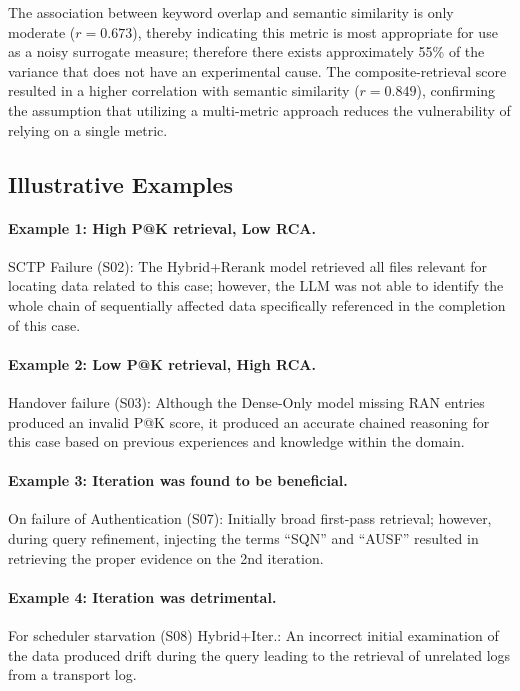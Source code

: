 \documentclass[11pt,a4paper]{article}
\begin{document}
The association between keyword overlap and semantic similarity is
only moderate ($r{=}0.673$), thereby indicating this metric is most
appropriate for use as a noisy surrogate measure; therefore there
exists approximately 55\% of the variance that does not have an
experimental cause.
The composite-retrieval score resulted in a higher correlation with
semantic similarity ($r{=}0.849$), confirming the assumption that
utilizing a multi-metric approach reduces the vulnerability of
relying on a single metric.

\subsection{Illustrative Examples}
\label{sec:cases}

\paragraph{Example 1: High P@K retrieval, Low RCA.}
SCTP Failure (S02): The Hybrid+Rerank model retrieved all files
relevant for locating data related to this case; however, the LLM
was not able to identify the whole chain of sequentially affected
data specifically referenced in the completion of this case.

\paragraph{Example 2: Low P@K retrieval, High RCA.}
Handover failure (S03): Although the Dense-Only model missing RAN
entries produced an invalid P@K score, it produced an accurate
chained reasoning for this case based on previous experiences and
knowledge within the domain.

\paragraph{Example 3: Iteration was found to be beneficial.}
On failure of Authentication (S07): Initially broad first-pass
retrieval; however, during query refinement, injecting the terms
``SQN'' and ``AUSF'' resulted in retrieving the proper evidence on
the 2nd iteration.

\paragraph{Example 4: Iteration was detrimental.}
For scheduler starvation (S08) Hybrid+Iter.: An incorrect initial
examination of the data produced drift during the query leading to
the retrieval of unrelated logs from a transport log.
\end{document}
